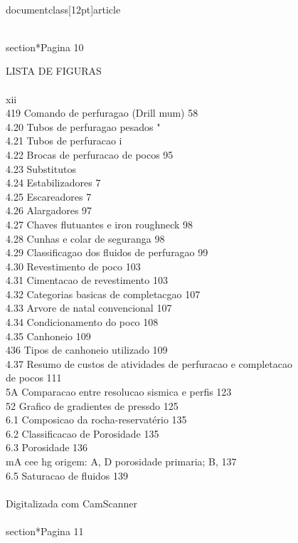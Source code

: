 \\documentclass[12pt]{article}
\begin{document}
\\section*{Pagina 10}

LISTA DE FIGURAS\\
\\
xii\\
419 Comando de perfuragao (Drill mum) 58\\
4.20 Tubos de perfuragao pesados "\\
4.21 Tubos de perfuracao i\\
4.22 Brocas de perfuracao de pocos 95\\
4.23 Substitutos \\%
4.24 Estabilizadores 7\\
4.25 Escareadores 7\\
4.26 Alargadores 97\\
4.27 Chaves flutuantes e iron roughneck 98\\
4.28 Cunhas e colar de seguranga 98\\
4.29 Classificagao dos fluidos de perfuragao 99\\
4.30 Revestimento de poco 103\\
4.31 Cimentacao de revestimento 103\\
4.32 Categorias basicas de completacgao 107\\
4.33 Arvore de natal convencional 107\\
4.34 Condicionamento do poco 108\\
4.35 Canhoneio 109\\
436 Tipos de canhoneio utilizado 109\\
4.37 Resumo de custos de atividades de perfuracao e completacao\\
de pocos 111\\
5A Comparacao entre resolucao sismica e perfis 123\\
52 Grafico de gradientes de pressdo 125\\
6.1 Composicao da rocha-reservatério 135\\
6.2 Classificacao de Porosidade 135\\
6.3 Porosidade 136\\
mA cee hg origem: A, D porosidade primaria; B, 137\\
6.5 Saturacao de fluidos 139\\
\\
Digitalizada com CamScanner\\

\\section*{Pagina 11}
\end{document}
